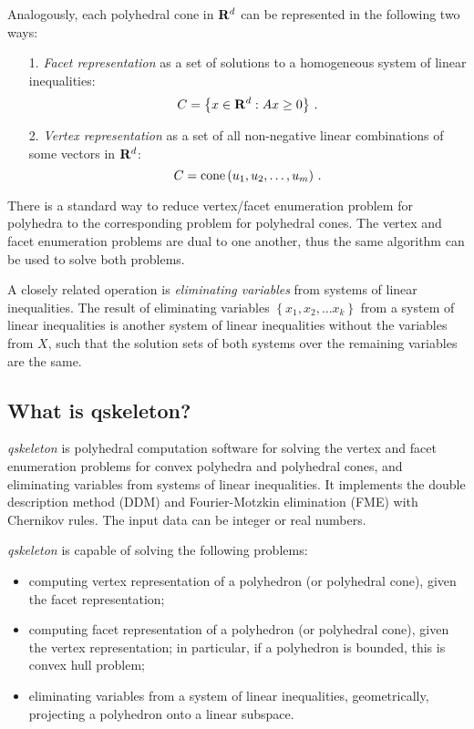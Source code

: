 \documentclass{article}
\newcommand{\qskeleton}{{\itshape qskeleton}\xspace}
\newcommand{\RR}{{\rm\bf R}}
\newcommand{\cone}[1]{\mathop{\rm cone} \left( #1 \right)}
\newcommand{\set}[1]{\left\{ #1\right\}}
\begin{document}
Analogously, each polyhedral cone in $\RR^d$
can be represented in the following two ways:
\begin{enumerate}
  \item[1.] {\em Facet representation} as a set of solutions to a homogeneous system of  linear inequalities:
$$
C = \set{x \in \RR^d: Ax \geq 0} \, .
$$
  \item[2.] {\em Vertex representation} as a set of all non-negative linear combinations of some vectors in $\RR^d$:
$$
C = \cone{u_1, u_2, \dots, u_m} \, .
$$
\end{enumerate}

There is a standard way to reduce vertex/facet enumeration problem for polyhedra
to the corresponding problem for polyhedral cones. The vertex and facet enumeration problems are dual to one another, thus the same algorithm can be used to solve both problems.

A closely related operation is {\em eliminating variables} from systems of linear inequalities. The result of eliminating variables $\set{x_1, x_2, \dots x_k}$ from a system of linear inequalities is another system of linear inequalities without the variables from $X$, such that the solution sets of both systems over the remaining variables are the same.

\subsection{What is qskeleton?}

\qskeleton is polyhedral computation software for solving the vertex and facet enumeration problems for convex polyhedra and polyhedral cones, and eliminating variables from systems of linear inequalities. It implements  the double description method (DDM) and Fourier-Motzkin elimination (FME) with Chernikov rules. The input data can be integer or real numbers.

\qskeleton is capable of solving the following problems:
\begin{itemize}
\item computing vertex representation of a polyhedron (or polyhedral cone), given the facet representation;
\item computing facet representation of a polyhedron (or polyhedral cone), given the vertex representation; in particular, if a polyhedron is bounded, this is convex hull problem;
\item eliminating variables from a system of linear inequalities, geometrically, projecting a polyhedron onto a linear subspace. 
\end{itemize}
\end{document}
